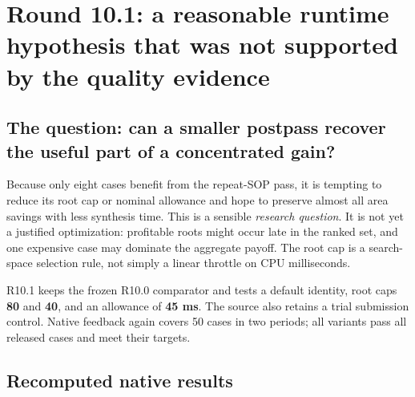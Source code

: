 \section{Round 10.1: a reasonable runtime hypothesis that was not supported by the quality evidence}\label{round-10.1-a-reasonable-runtime-hypothesis-that-was-not-supported-by-the-quality-evidence}

\subsection{The question: can a smaller postpass recover the useful part of a concentrated gain?}\label{the-question-can-a-smaller-postpass-recover-the-useful-part-of-a-concentrated-gain}

Because only eight cases benefit from the repeat-SOP pass, it is tempting to reduce its root cap or nominal allowance and hope to preserve almost all area savings with less synthesis time. This is a sensible \emph{research question}. It is not yet a justified optimization: profitable roots might occur late in the ranked set, and one expensive case may dominate the aggregate payoff. The root cap is a search-space selection rule, not simply a linear throttle on CPU milliseconds.

R10.1 keeps the frozen R10.0 comparator and tests a default identity, root caps \textbf{80} and \textbf{40}, and an allowance of \textbf{45 ms}. The source also retains a trial submission control. Native feedback again covers 50 cases in two periods; all variants pass all released cases and meet their targets.

\subsection{Recomputed native results}\label{recomputed-native-results}

